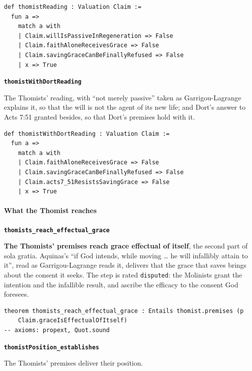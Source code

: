 \documentclass[11pt]{article}
\begin{document}
{\small\begin{verbatim}
def thomistReading : Valuation Claim :=
  fun a =>
    match a with
    | Claim.willIsPassiveInRegeneration => False
    | Claim.faithAloneReceivesGrace => False
    | Claim.savingGraceCanBeFinallyRefused => False
    | x => True
\end{verbatim}}
\par\medskip\noindent\textbf{\texttt{thomist\allowbreak{}With\allowbreak{}Dort\allowbreak{}Reading}}\par\nobreak\noindent
The Thomists’ reading, with “not merely passive” taken as Garrigou-Lagrange explains it, so that the will is not the agent of its new life; and Dort’s answer to Acts 7:51 granted besides, so that Dort’s premises hold with it.

{\small\begin{verbatim}
def thomistWithDortReading : Valuation Claim :=
  fun a =>
    match a with
    | Claim.faithAloneReceivesGrace => False
    | Claim.savingGraceCanBeFinallyRefused => False
    | Claim.acts7_51ResistsSavingGrace => False
    | x => True
\end{verbatim}}
\paragraph*{What the Thomist reaches}
\leavevmode\par\nobreak
\par\medskip\noindent\textbf{\texttt{thomists\_\allowbreak{}reach\_\allowbreak{}effectual\_\allowbreak{}grace}}\par\nobreak\noindent
\textbf{The Thomists’ premises reach grace effectual of itself}, the second part of sola gratia. Aquinas’s “if God intends, while moving … he will infallibly attain to it”, read as Garrigou-Lagrange reads it, delivers that the grace that saves brings about the consent it seeks. The step is rated \texttt{disputed}: the Molinists grant the intention and the infallible result, and ascribe the efficacy to the consent God foresees.

{\small\begin{verbatim}
theorem thomists_reach_effectual_grace : Entails thomist.premises (p
    Claim.graceIsEffectualOfItself)
-- axioms: propext, Quot.sound
\end{verbatim}}
\par\medskip\noindent\textbf{\texttt{thomist\allowbreak{}Position\_\allowbreak{}establishes}}\par\nobreak\noindent
The Thomists’ premises deliver their position.
\end{document}
